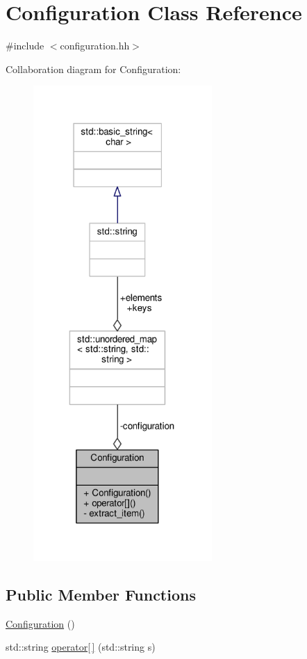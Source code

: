 \hypertarget{classConfiguration}{\section{Configuration Class Reference}
\label{classConfiguration}
}


{\ttfamily \#include $<$configuration.\-hh$>$}



Collaboration diagram for Configuration\-:
\nopagebreak
\begin{figure}[H]
\begin{center}
\leavevmode
\includegraphics[width=193pt]{classConfiguration__coll__graph}
\end{center}
\end{figure}
\subsection*{Public Member Functions}
\begin{DoxyCompactItemize}
\item 
\hyperlink{classConfiguration_a779947337bf652f0e773cb29f37f14ba}{Configuration} ()
\item 
std\-::string \hyperlink{classConfiguration_ad01eea5b98871f1cc4dbf28b9fe92093}{operator\mbox{[}$\,$\mbox{]}} (std\-::string s)
\end{DoxyCompactItemize}
